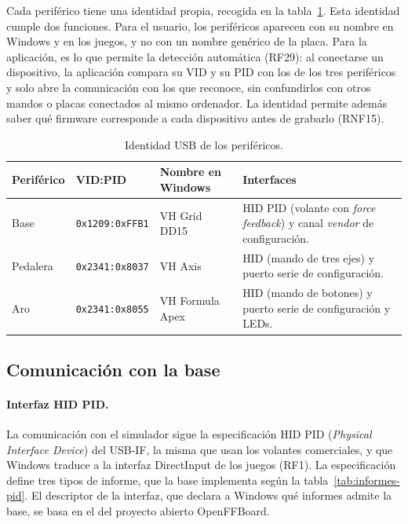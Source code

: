 Cada periférico tiene una identidad propia, recogida en la tabla~\ref{tab:identidad-usb}. Esta identidad cumple dos funciones. Para el usuario, los periféricos aparecen con su nombre en Windows y en los juegos, y no con un nombre genérico de la placa. Para la aplicación, es lo que permite la detección automática (RF29): al conectarse un dispositivo, la aplicación compara su VID y su PID con los de los tres periféricos y solo abre la comunicación con los que reconoce, sin confundirlos con otros mandos o placas conectados al mismo ordenador. La identidad permite además saber qué firmware corresponde a cada dispositivo antes de grabarlo (RNF15).

\begin{table}[H]
	\centering
	\caption{Identidad USB de los periféricos.}
	\label{tab:identidad-usb}
	\small
	\begin{tabularx}{\textwidth}{@{}>{\raggedright\arraybackslash}p{1.6cm}>{\raggedright\arraybackslash}p{2.8cm}>{\raggedright\arraybackslash}p{2.8cm}>{\raggedright\arraybackslash}X@{}}
		\toprule
		\textbf{Periférico} & \textbf{VID:PID} & \textbf{Nombre en Windows} & \textbf{Interfaces} \\
		\midrule
		Base & \texttt{0x1209:0xFFB1} & VH Grid DD15 & HID PID (volante con \textit{force feedback}) y canal \textit{vendor} de configuración. \\
		Pedalera & \texttt{0x2341:0x8037} & VH Axis & HID (mando de tres ejes) y puerto serie de configuración. \\
		Aro & \texttt{0x2341:0x8055} & VH Formula Apex & HID (mando de botones) y puerto serie de configuración y LEDs. \\
		\bottomrule
	\end{tabularx}
\end{table}

\subsection{Comunicación con la base}
\label{subsec:protocolo-base}
\paragraph{Interfaz HID PID.}
La comunicación con el simulador sigue la especificación HID PID (\textit{Physical Interface Device}) del USB-IF, la misma que usan los volantes comerciales, y que Windows traduce a la interfaz DirectInput de los juegos (RF1). La especificación define tres tipos de informe, que la base implementa según la tabla~\ref{tab:informes-pid}. El descriptor de la interfaz, que declara a Windows qué informes admite la base, se basa en el del proyecto abierto OpenFFBoard.

